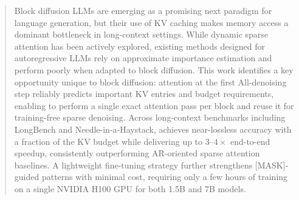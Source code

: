 \documentclass{article}
\theoremstyle{plain}
\theoremstyle{definition}
\theoremstyle{remark}
\begin{document}


\printAffiliationsAndNotice{}

\begin{abstract}
Block diffusion LLMs are emerging as a promising next paradigm for language generation, but their use of KV caching makes memory access a dominant bottleneck in long-context settings.
While dynamic sparse attention has been actively explored, existing methods designed for autoregressive LLMs rely on approximate importance estimation and perform poorly when adapted to block diffusion.
This work identifies a key opportunity unique to block diffusion: attention at the first All-\mask denoising step reliably predicts important KV entries and budget requirements, enabling \name to perform a single exact attention pass per block and reuse it for training-free sparse denoising.
Across long-context benchmarks including LongBench and Needle-in-a-Haystack, \name achieves near-lossless accuracy with a fraction of the KV budget while delivering up to $3$--$4\times$ end-to-end speedup, consistently outperforming AR-oriented sparse attention baselines.
A lightweight fine-tuning strategy further strengthens 
[MASK]-guided patterns with minimal cost, requiring only a few hours of training on a single NVIDIA H100 GPU for 
both 1.5B and 7B models.
\end{abstract}
\end{document}
